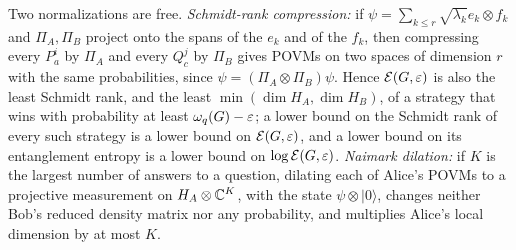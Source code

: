 \begin{remark}\label{rem:local-dimension}
Two normalizations are free. \emph{Schmidt-rank compression:} if $\psi=\sum_{k\le r}\sqrt{\lambda_k}e_k\otimes f_k$ and $\Pi_A,\Pi_B$
project onto the spans of the $e_k$ and of the $f_k$, then compressing every $P^i_a$ by $\Pi_A$ and every $Q^j_c$ by $\Pi_B$ gives POVMs
on two spaces of dimension $r$ with the same probabilities, since $\psi=(\Pi_A\otimes\Pi_B)\psi$. Hence $\mathcal E(G,\varepsilon)$ is also the least
Schmidt rank, and the least $\min(\dim H_A,\dim H_B)$, of a strategy that wins with probability at least $\omega_{q}(G)-\varepsilon$; a lower bound on
the Schmidt rank of every such strategy is a lower bound on $\mathcal E(G,\varepsilon)$, and a lower bound on its entanglement entropy is a lower bound
on $\log\mathcal E(G,\varepsilon)$. \emph{Naimark dilation:} if $K$ is the largest number of answers to a question, dilating each of Alice's POVMs to a
projective measurement on $H_A\otimes\mathbb C^K$, with the state $\psi\otimes|0\rangle$, changes neither Bob's reduced density matrix nor any
probability, and multiplies Alice's local dimension by at most $K$.
\end{remark}
